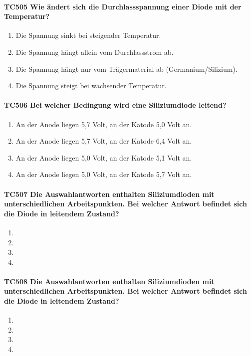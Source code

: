 \documentclass[8pt]{article}
\begin{document}
\begin{enumerate}
\begin{enumerate}[nolistsep,label=\Alph*]
{\paragraph*{TC505 Wie ändert sich die Durchlassspannung einer Diode mit der Temperatur?}
\begin{enumerate}[nolistsep,label=\Alph*]
\item Die Spannung sinkt bei steigender Temperatur.
\item Die Spannung hängt allein vom Durchlassstrom ab.
\item Die Spannung hängt nur vom Trägermaterial ab (Germanium/Silizium).
\item Die Spannung steigt bei wachsender Temperatur.
\end{enumerate}

\paragraph*{TC506 Bei welcher Bedingung wird eine Siliziumdiode leitend?}
\begin{enumerate}[nolistsep,label=\Alph*]
\item An der Anode liegen 5,7 Volt, an der Katode 5,0 Volt an.
\item An der Anode liegen 5,7 Volt, an der Katode 6,4 Volt an.
\item An der Anode liegen 5,0 Volt, an der Katode 5,1 Volt an.
\item An der Anode liegen 5,0 Volt, an der Katode 5,7 Volt an.
\end{enumerate}

\paragraph*{TC507 Die Auswahlantworten enthalten Siliziumdioden mit unterschiedlichen Arbeitspunkten. Bei welcher Antwort befindet sich die Diode in leitendem Zustand?}
\begin{enumerate}[nolistsep,label=\Alph*]
\item 
\item 
\item 
\item 
\end{enumerate}

\paragraph*{TC508 Die Auswahlantworten enthalten Siliziumdioden mit unterschiedlichen Arbeitspunkten. Bei welcher Antwort befindet sich die Diode in leitendem Zustand?}
\begin{enumerate}[nolistsep,label=\Alph*]
\item 
\item 
\item 
\item 
\end{enumerate}

}
\end{enumerate}
\end{enumerate}
\end{document}
